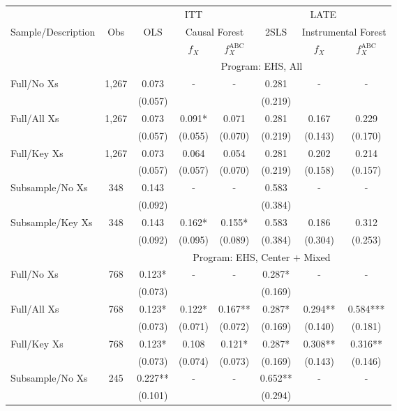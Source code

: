 \begin{tabular}{lccccccc}
\toprule 
\midrule 
\multicolumn{2}{c}{} & \multicolumn{3}{c}{ITT} & \multicolumn{3}{c}{LATE} \\
 \cmidrule(lr){3-5} \cmidrule(lr){6-8} 
Sample/Description & Obs & OLS & \multicolumn{2}{c}{Causal Forest} & 2SLS & \multicolumn{2}{c}{Instrumental Forest} \\
\multicolumn{3}{c}{} & $f_X$ & $f_X^{\text{ABC}}$ &  & $f_X$ & $f_X^{\text{ABC}}$ \\
\midrule 
 &  & \multicolumn{6}{c}{Program: EHS, All} \\
 \cmidrule(lr){3-8} 
Full/No Xs & 1,267 & 0.073 & - & - & 0.281 & - & - \\
 &  & (0.057) &  &  & (0.219) &  &  \\
Full/All Xs & 1,267 & 0.073 & 0.091* & 0.071 & 0.281 & 0.167 & 0.229 \\
 &  & (0.057) & (0.055) & (0.070) & (0.219) & (0.143) & (0.170) \\
Full/Key Xs & 1,267 & 0.073 & 0.064 & 0.054 & 0.281 & 0.202 & 0.214 \\
 &  & (0.057) & (0.057) & (0.070) & (0.219) & (0.158) & (0.157) \\
Subsample/No Xs & 348 & 0.143 & - & - & 0.583 & - & - \\
 &  & (0.092) &  &  & (0.384) &  &  \\
Subsample/Key Xs & 348 & 0.143 & 0.162* & 0.155* & 0.583 & 0.186 & 0.312 \\
 &  & (0.092) & (0.095) & (0.089) & (0.384) & (0.304) & (0.253) \\
\midrule 
 &  & \multicolumn{6}{c}{Program: EHS, Center $+$ Mixed} \\
 \cmidrule(lr){3-8} 
Full/No Xs & 768 & 0.123* & - & - & 0.287* & - & - \\
 &  & (0.073) &  &  & (0.169) &  &  \\
Full/All Xs & 768 & 0.123* & 0.122* & 0.167** & 0.287* & 0.294** & 0.584*** \\
 &  & (0.073) & (0.071) & (0.072) & (0.169) & (0.140) & (0.181) \\
Full/Key Xs & 768 & 0.123* & 0.108 & 0.121* & 0.287* & 0.308** & 0.316** \\
 &  & (0.073) & (0.074) & (0.073) & (0.169) & (0.143) & (0.146) \\
Subsample/No Xs & 245 & 0.227** & - & - & 0.652** & - & - \\
 &  & (0.101) &  &  & (0.294) &  &  \\

\end{tabular}
